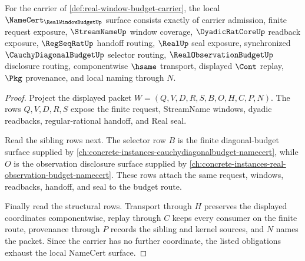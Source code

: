\begin{theorem}
\label{thm:real-window-budget-namecert-obligations}
For the carrier of \autoref{def:real-window-budget-carrier}, the local $\NameCert_{\RealWindowBudgetUp}$ surface consists exactly of carrier admission, finite request exposure, $\StreamNameUp$ window coverage, $\DyadicRatCoreUp$ readback exposure, $\RegSeqRatUp$ handoff routing, $\RealUp$ seal exposure, synchronized $\CauchyDiagonalBudgetUp$ selector routing, $\RealObservationBudgetUp$ disclosure routing, componentwise $\hsame$ transport, displayed $\Cont$ replay, $\Pkg$ provenance, and local naming through $N$.
\end{theorem}
\begin{proof}
Project the displayed packet $W=(Q,V,D,R,S,B,O,H,C,P,N)$. The rows $Q,V,D,R,S$ expose the finite request, StreamName windows, dyadic readbacks, regular-rational handoff, and Real seal.

Read the sibling rows next. The selector row $B$ is the finite diagonal-budget surface supplied by \autoref{ch:concrete-instances-cauchydiagonalbudget-namecert}, while $O$ is the observation disclosure surface supplied by \autoref{ch:concrete-instances-real-observation-budget-namecert}. These rows attach the same request, windows, readbacks, handoff, and seal to the budget route.

Finally read the structural rows. Transport through $H$ preserves the displayed coordinates componentwise, replay through $C$ keeps every consumer on the finite route, provenance through $P$ records the sibling and kernel sources, and $N$ names the packet. Since the carrier has no further coordinate, the listed obligations exhaust the local NameCert surface.
\end{proof}

